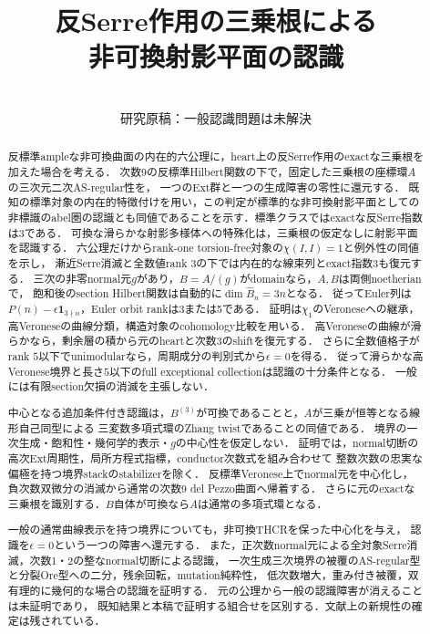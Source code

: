 \documentclass[11pt,a4paper]{ltjsarticle}
\title{反Serre作用の三乗根による\\非可換射影平面の認識}
\author{}
\date{\versiondate\\研究原稿：一般認識問題は未解決}
\begin{document}
\maketitle
\begin{abstract}
反標準ampleな非可換曲面の内在的六公理に，heart上の反Serre作用のexactな三乗根を加えた場合を考える．
次数9の反標準Hilbert関数の下で，固定した三乗根の座標環$A$の三次元二次AS-regular性を，
一つのExt群と一つの生成障害の零性に還元する．
既知の標準対象の内在的特徴付けを用い，この判定が標準的な非可換射影平面としての
非標識のabel圏の認識とも同値であることを示す．標準クラスではexactな反Serre指数は3である．
可換な滑らかな射影多様体への特殊化は，三乗根の仮定なしに射影平面を認識する．
六公理だけからrank-one torsion-free対象の$\chi(I,I)=1$と例外性の同値を示し，
漸近Serre消滅と全数値rank $3$の下では内在的な線束列とexact指数$3$も復元する．
三次の非零normal元$g$があり，$B=A/(g)$がdomainなら，$A,B$は両側noetherianで，
飽和後のsection Hilbert関数は自動的に$\dim\widehat B_n=3n$となる．
従ってEuler列は$P(n)-\epsilon\mathbf1_{3\nmid n}$，Euler orbit rankは3または5である．
証明は$\chi_1$のVeroneseへの継承，高Veroneseの曲線分類，構造対象のcohomology比較を用いる．
高Veroneseの曲線が滑らかなら，剰余層の積から元のheartと次数3のshiftを復元する．
さらに全数値格子がrank $5$以下でunimodularなら，周期成分の判別式から$\epsilon=0$を得る．
従って滑らかな高Veronese境界と長さ$5$以下のfull exceptional collectionは認識の十分条件となる．
一般には有限section欠損の消滅を主張しない．

中心となる追加条件付き認識は，$B^{(3)}$が可換であることと，$A$が三乗が恒等となる線形自己同型による
三変数多項式環のZhang twistであることの同値である．
境界の一次生成・飽和性・幾何学的表示・$g$の中心性を仮定しない．
証明では，normal切断の高次Ext周期性，局所方程式指標，conductor次数式を組み合わせて
整数次数の忠実な偏極を持つ境界stackのstabilizerを除く．
反標準Veronese上でnormal元を中心化し，負次数双微分の消滅から通常の次数9 del Pezzo曲面へ帰着する．
さらに元のexactな三乗根を識別する．$B$自体が可換なら$A$は通常の多項式環となる．

一般の通常曲線表示を持つ境界についても，非可換THCRを保った中心化を与え，
認識を$\epsilon=0$という一つの障害へ還元する．
また，正次数normal元による全対象Serre消滅，次数1・2の整なnormal切断による認識，
一次生成三次境界の被覆のAS-regular型と分裂Ore型への二分，残余回転，mutation純粋性，
低次数増大，重み付き被覆，双有理的に幾何的な場合の認識を証明する．
元の公理から一般の認識障害が消えることは未証明であり，
既知結果と本稿で証明する組合せを区別する．文献上の新規性の確定は残されている．
\end{abstract}
\begingroup\fontsize{11}{14}\selectfont
\tableofcontents
\endgroup
\end{document}
